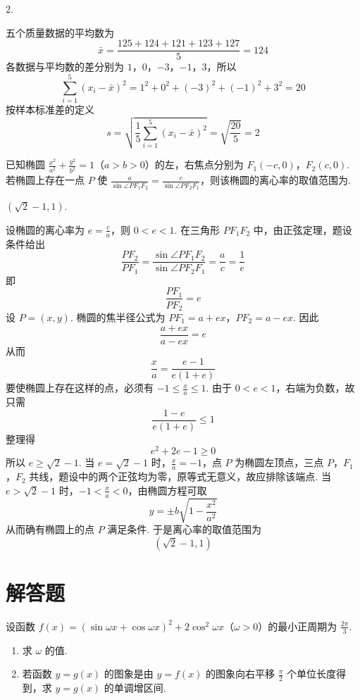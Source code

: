 \begin{answer}
\(2\).
\end{answer}

\begin{solution}
五个质量数据的平均数为
\[
\bar x=\frac{125+124+121+123+127}{5}=124
\]
各数据与平均数的差分别为 \(1\)，\(0\)，\(-3\)，\(-1\)，\(3\)，所以
\[
\sum_{i=1}^{5}(x_i-\bar x)^2=1^2+0^2+(-3)^2+(-1)^2+3^2=20
\]
按样本标准差的定义
\[
s=\sqrt{\frac15\sum_{i=1}^{5}(x_i-\bar x)^2}=\sqrt{\frac{20}{5}}=2
\]
\end{solution}

\begin{problem}
已知椭圆 \(\frac{x^2}{a^2} + \frac{y^2}{b^2} = 1\)（\(a > b > 0\)）的左，右焦点分别为 \(F_1(-c,0)\)，\(F_2(c,0)\).
若椭圆上存在一点 \(P\) 使 \(\frac{a}{\sin \angle PF_1F_2} = \frac{c}{\sin \angle PF_2F_1}\)，则该椭圆的离心率的取值范围为\fillinblank{}.
\end{problem}

\begin{answer}
\(\left(\sqrt{2}-1,1\right)\).
\end{answer}

\begin{solution}
设椭圆的离心率为 \(e=\frac ca\)，则 \(0<e<1\). 在三角形 \(PF_1F_2\) 中，由正弦定理，题设条件给出
\[
\frac{PF_2}{PF_1}=\frac{\sin\angle PF_1F_2}{\sin\angle PF_2F_1}=\frac ac=\frac1e
\]
即
\[
\frac{PF_1}{PF_2}=e
\]
设 \(P=(x,y)\). 椭圆的焦半径公式为
\(PF_1=a+ex\)，\(PF_2=a-ex\).
因此
\[
\frac{a+ex}{a-ex}=e
\]
从而
\[
\frac xa=\frac{e-1}{e(1+e)}
\]
要使椭圆上存在这样的点，必须有 \(-1\leqslant \frac{x}{a}\leqslant1\). 由于 \(0<e<1\)，右端为负数，故只需
\[
\frac{1-e}{e(1+e)}\leqslant1
\]
整理得
\[
e^2+2e-1\geqslant0
\]
所以 \(e\geqslant\sqrt2-1\). 当 \(e=\sqrt2-1\) 时，\(\frac{x}{a}=-1\)，点 \(P\) 为椭圆左顶点，三点 \(P\)，\(F_1\)，\(F_2\) 共线，题设中的两个正弦均为零，原等式无意义，故应排除该端点. 当 \(e>\sqrt2-1\) 时，\(-1<\frac{x}{a}<0\)，由椭圆方程可取
\[
y=\pm b\sqrt{1-\frac{x^2}{a^2}}
\]
从而确有椭圆上的点 \(P\) 满足条件. 于是离心率的取值范围为
\[
\left(\sqrt2-1,1\right)
\]
\end{solution}

\section{解答题}

\begin{problem}
设函数 \( f(x) = (\sin \omega x + \cos \omega x)^2 + 2\cos^2 \omega x \)（\(\omega > 0\)）的最小正周期为 \( \frac{2\pi}{3} \).
\begin{enumerate}
\item 求 \( \omega \) 的值.
\item 若函数 \( y = g(x) \) 的图象是由 \( y = f(x) \) 的图象向右平移 \( \frac{\pi}{2} \) 个单位长度得到，求 \( y = g(x) \) 的单调增区间.
\end{enumerate}
\end{problem}

